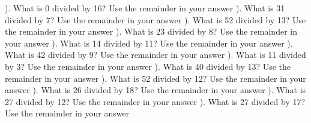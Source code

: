 \documentclass{article}%
\begin{document}
\newline%
). What is 0 divided by 16? Use the remainder in your answer%
\newline%
\newline%
). What is 31 divided by 7? Use the remainder in your answer%
\newline%
\newline%
). What is 52 divided by 13? Use the remainder in your answer%
\newline%
\newline%
). What is 23 divided by 8? Use the remainder in your answer%
\newline%
\newline%
). What is 14 divided by 11? Use the remainder in your answer%
\newline%
\newline%
). What is 42 divided by 9? Use the remainder in your answer%
\newline%
\newline%
). What is 11 divided by 3? Use the remainder in your answer%
\newline%
\newline%
). What is 40 divided by 13? Use the remainder in your answer%
\newline%
\newline%
). What is 52 divided by 12? Use the remainder in your answer%
\newline%
\newline%
). What is 26 divided by 18? Use the remainder in your answer%
\newline%
\newline%
). What is 27 divided by 12? Use the remainder in your answer%
\newline%
\newline%
). What is 27 divided by 17? Use the remainder in your answer%
\newline%
\newline%
\end{document}
